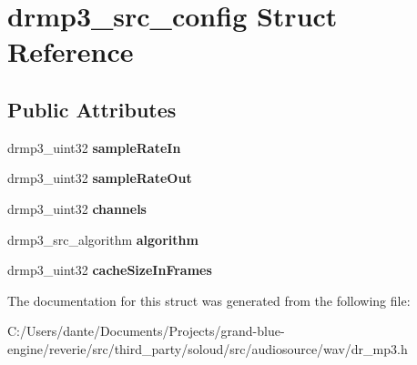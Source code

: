 \hypertarget{structdrmp3__src__config}{}\section{drmp3\+\_\+src\+\_\+config Struct Reference}
\label{structdrmp3__src__config}
\subsection*{Public Attributes}
\begin{DoxyCompactItemize}
\item 
\mbox{\label{structdrmp3__src__config_a0ce2b4d2d4261c13e95c3d4ce30528ab}} 
drmp3\+\_\+uint32 {\bfseries sample\+Rate\+In}
\item 
\mbox{\label{structdrmp3__src__config_a5e5fa107151bf047c2ef4c7d01c5ab17}} 
drmp3\+\_\+uint32 {\bfseries sample\+Rate\+Out}
\item 
\mbox{\label{structdrmp3__src__config_a82ccbbdc492d67e1f80c0add73ccdf5c}} 
drmp3\+\_\+uint32 {\bfseries channels}
\item 
\mbox{\label{structdrmp3__src__config_a9a8c9b83950a124c67381d52dc00915d}} 
drmp3\+\_\+src\+\_\+algorithm {\bfseries algorithm}
\item 
\mbox{\label{structdrmp3__src__config_afa3c413208e1fced054265709366c688}} 
drmp3\+\_\+uint32 {\bfseries cache\+Size\+In\+Frames}
\end{DoxyCompactItemize}


The documentation for this struct was generated from the following file\+:\begin{DoxyCompactItemize}
\item 
C\+:/\+Users/dante/\+Documents/\+Projects/grand-\/blue-\/engine/reverie/src/third\+\_\+party/soloud/src/audiosource/wav/dr\+\_\+mp3.\+h\end{DoxyCompactItemize}
